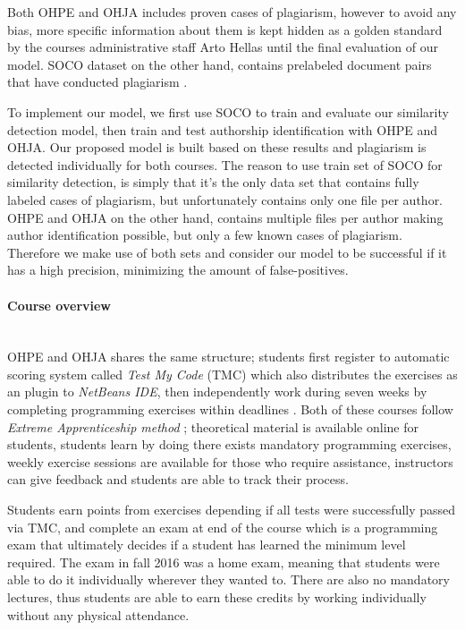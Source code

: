 Both OHPE and OHJA includes proven cases of plagiarism, however to avoid any bias, more specific information about them is kept hidden as a golden standard by the courses administrative staff Arto Hellas until the final evaluation of our model. SOCO dataset on the other hand, contains prelabeled document pairs that have conducted plagiarism \cite{saez2014pan}.

To implement our model, we first use SOCO to train and evaluate our similarity detection model, then train and test authorship identification with OHPE and OHJA. Our proposed model is built based on these results and plagiarism is detected individually for both courses. The reason to use train set of SOCO for similarity detection, is simply that it's the only data set that contains fully labeled cases of plagiarism, but unfortunately contains only one file per author. OHPE and OHJA on the other hand, contains multiple files per author making author identification possible, but only a few known cases of plagiarism. Therefore we make use of both sets and consider our model to be successful if it has a high precision, minimizing the amount of false-positives. 

\paragraph{Course overview}\mbox{}\\
OHPE and OHJA shares the same structure; students first register to automatic scoring system called \emph{Test My Code} (TMC) \cite{Vihavainen:2013:SSL:2462476.2462501} which also distributes the exercises as an plugin to \emph{NetBeans IDE}, then independently work during seven weeks by completing programming exercises within deadlines \cite{Vihavainen:2012:MSM:2380552.2380603}. Both of these courses follow \emph{Extreme Apprenticeship method} \cite{Vihavainen:2011:EAM:1953163.1953196}; theoretical material is available online for students, students learn by doing \ie there exists mandatory programming exercises, weekly exercise sessions are available for those who require assistance, instructors can give feedback and students are able to track their process. 

Students earn points from exercises depending if all tests were successfully passed via TMC, and complete an exam at end of the course which is a programming exam that ultimately decides if a student has learned the minimum level required. The exam in fall 2016 was a home exam, meaning that students were able to do it individually wherever they wanted to. There are also no mandatory lectures, thus students are able to earn these credits by working individually without any physical attendance. 

